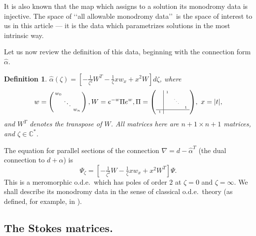 \documentclass[a4paper,12pt,leqno]{amsart}
\numberwithin{equation}{section}
\theoremstyle{plain}
\newtheorem{definition}[theorem]{Definition}
\theoremstyle{definition}
\newcommand{\C}{\mathbb C}
\newcommand{\al}{\alpha}
\newcommand{\ze}{\zeta}
\renewcommand{\ll}{\lq\lq}
\newcommand{\rr}{\rq\rq\ }
\newcommand{\bsp}{\left(\begin{smallmatrix}}
\newcommand{\esp}{\end{smallmatrix}\right)}
\begin{document}
It is also known that the map which assigns to a solution its
monodromy data is injective. The space of \ll all allowable monodromy data\rr is the
space of interest to us in this article --- it is the data which parametrizes solutions in the most intrinsic way.

Let us now review the definition of this data, beginning with the connection form $\hat\al$.
\begin{definition}\label{hatalpha-ze}
$\hat\al(\ze)=
\left[
-\tfrac{1}{\ze^2} W^T - \tfrac{1}{\ze} xw_x + x^2 W
\right]
d\ze$,
where
\[
w=
\bsp
 w_0  & &  \\
  &  \ddots& \\
  &  & w_n
\esp,
W=e^{-w} \Pi e^w,
\Pi=
{\tiny
\left(
\begin{array}{c|ccc}
 & \!1\! & &  \\
  &  &  \!\ddots\! & \\
  &  &   & \!1\!  \\
  \hline
 \!1\! &  &  &
\end{array}
\right)},
\ x=\vert t\vert,
\]
and $W^T$ denotes the transpose of $W$.
All matrices here are $n+1\times n+1$ matrices, and $\ze\in\C^\ast$.
\end{definition}
The equation for parallel sections of the connection $\nabla=d-\hat\al^T$ (the
dual connection to $d+\hat\al$) is
\begin{equation}\label{psizeta}
\Psi_\ze=
\left[
-\tfrac{1}{\ze^2} W - \tfrac{1}{\ze} xw_x + x^2 W^T
\right]
\Psi.
\end{equation}
This is a meromorphic o.d.e.\ which
has poles of order $2$ at $\ze=0$ and $\ze=\infty$.
We shall describe its monodromy data in the sense of classical o.d.e.\ theory (as
defined, for example, in \cite{FIKN06}).

\subsection{The Stokes matrices.}\label{stokes}
\end{document}
